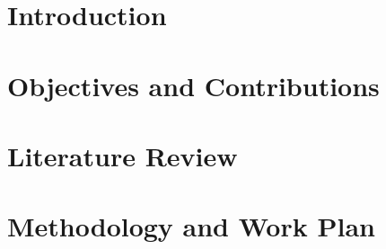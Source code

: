 \documentclass[10pt,a4paper,twoside]{report}
\begin{document}




\begin{Prolog}
\cleardoublepage

\tableofcontents



%

	
\end{Prolog}

\StartBody

\chapter{Introduction}



\chapter{Objectives and Contributions}


\chapter{Literature Review}














%

\chapter{Methodology and Work Plan}

\end{document}
